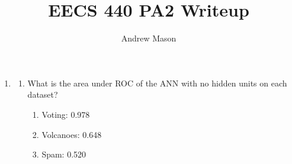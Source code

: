 \documentclass[12pt]{article}
\title{EECS 440 PA2 Writeup}
\author{Andrew Mason}
\begin{document}
\maketitle

\begin{enumerate}
  \item
    \begin{enumerate}
      \item What is the area under ROC of the ANN with no hidden units on each
      dataset?\\
        \begin{enumerate}
          \item Voting: 0.978
          \item Volcanoes: 0.648
          \item Spam: 0.520
        \end{enumerate}


\end{enumerate}
\end{enumerate}
\end{document}
